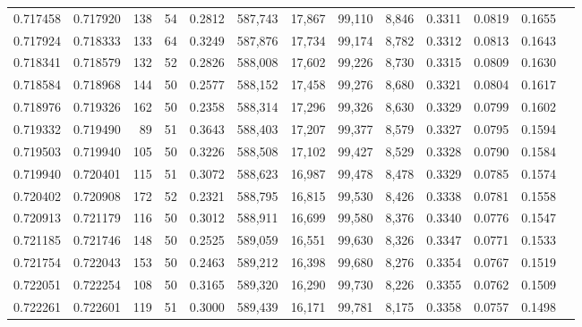 \begin{tabular}{rrrrrrrrrrrrr}
0.717458 & 0.717920 &   138 &  54 &                                     0.2812 & 587,743 &  17,867 &  99,110 &   8,846 & 0.3311 & 0.0819 & 0.1655 \\
0.717924 & 0.718333 &   133 &  64 &                                     0.3249 & 587,876 &  17,734 &  99,174 &   8,782 & 0.3312 & 0.0813 & 0.1643 \\
0.718341 & 0.718579 &   132 &  52 &                                     0.2826 & 588,008 &  17,602 &  99,226 &   8,730 & 0.3315 & 0.0809 & 0.1630 \\
0.718584 & 0.718968 &   144 &  50 &                                     0.2577 & 588,152 &  17,458 &  99,276 &   8,680 & 0.3321 & 0.0804 & 0.1617 \\
0.718976 & 0.719326 &   162 &  50 &                                     0.2358 & 588,314 &  17,296 &  99,326 &   8,630 & 0.3329 & 0.0799 & 0.1602 \\
0.719332 & 0.719490 &    89 &  51 &                                     0.3643 & 588,403 &  17,207 &  99,377 &   8,579 & 0.3327 & 0.0795 & 0.1594 \\
0.719503 & 0.719940 &   105 &  50 &                                     0.3226 & 588,508 &  17,102 &  99,427 &   8,529 & 0.3328 & 0.0790 & 0.1584 \\
0.719940 & 0.720401 &   115 &  51 &                                     0.3072 & 588,623 &  16,987 &  99,478 &   8,478 & 0.3329 & 0.0785 & 0.1574 \\
0.720402 & 0.720908 &   172 &  52 &                                     0.2321 & 588,795 &  16,815 &  99,530 &   8,426 & 0.3338 & 0.0781 & 0.1558 \\
0.720913 & 0.721179 &   116 &  50 &                                     0.3012 & 588,911 &  16,699 &  99,580 &   8,376 & 0.3340 & 0.0776 & 0.1547 \\
0.721185 & 0.721746 &   148 &  50 &                                     0.2525 & 589,059 &  16,551 &  99,630 &   8,326 & 0.3347 & 0.0771 & 0.1533 \\
0.721754 & 0.722043 &   153 &  50 &                                     0.2463 & 589,212 &  16,398 &  99,680 &   8,276 & 0.3354 & 0.0767 & 0.1519 \\
0.722051 & 0.722254 &   108 &  50 &                                     0.3165 & 589,320 &  16,290 &  99,730 &   8,226 & 0.3355 & 0.0762 & 0.1509 \\
0.722261 & 0.722601 &   119 &  51 &                                     0.3000 & 589,439 &  16,171 &  99,781 &   8,175 & 0.3358 & 0.0757 & 0.1498 \\

\end{tabular}
